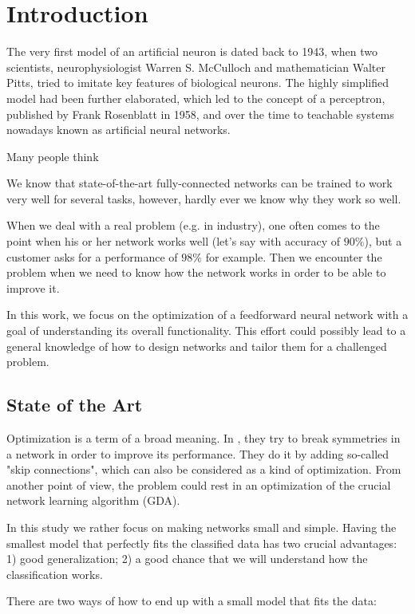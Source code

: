 \chapter{Introduction} \label{chap:introduction}
The very first model of an artificial neuron is dated back to 1943, when two scientists, neurophysiologist Warren S. McCulloch and mathematician Walter Pitts, tried to imitate key features of biological neurons. The highly simplified model had been further elaborated, which led to the concept of a perceptron, published by Frank Rosenblatt in 1958, and over the time to teachable systems nowadays known as artificial neural networks.

Many people think

We know that state-of-the-art fully-connected networks can be trained to
work very well for several tasks, however, hardly ever we know why they work
so well.

When we deal with a real problem (e.g. in industry), one often comes to the point when his or her network works well (let's say with accuracy of $ 90\% $), but a customer asks for a performance of $ 98\% $ for example. Then we encounter the problem when we need to know how the network works in order to be able to improve it.

In this work, we focus on the optimization of a feedforward neural network with a goal of understanding its overall functionality. This effort could possibly lead to a general knowledge of how to design networks and tailor them for a challenged problem.

\newpage
\section{State of the Art} \label{sec:state_of_the_art}
Optimization is a term of a broad meaning. In \citep{orhan:symmetry}, they try to break symmetries in a network in order to improve its performance. They do it by adding so-called "skip connections", which can also be considered as a kind of optimization. From another point of view, the problem could rest in an optimization of the crucial network learning algorithm (GDA).

In this study we rather focus on making networks small and simple. Having the smallest model that perfectly fits the classified data has two crucial advantages: 1) good generalization; 2) a good chance that we will understand how the classification works.

There are two ways of how to end up with a small model that fits the data:

